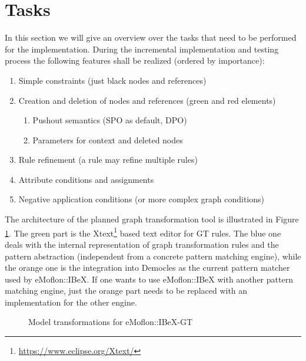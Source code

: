 \section{Tasks}
\label{tasks}
In this section we will give an overview over the tasks that need to be performed for the implementation.
During the incremental implementation and testing process the following features shall be realized (ordered by importance):
\begin{enumerate}
	\item Simple constraints (just black nodes and references)
	\item Creation and deletion of nodes and references (green and red elements)
		\begin{enumerate}
			\item Pushout semantics (SPO as default, DPO)
			\item Parameters for context and deleted nodes
		\end{enumerate}
	\item Rule refinement (a rule may refine multiple rules)
	\item Attribute conditions and assignments
	\item Negative application conditions (or more complex graph conditions)
\end{enumerate}
The architecture of the planned graph transformation tool is illustrated in Figure \ref{fig:model-transformations}. 
The green part is the Xtext\footnote{\url{https://www.eclipse.org/Xtext/}} based text editor for GT rules.
The blue one deals with the internal representation of graph transformation rules and the pattern abstraction (independent from a concrete pattern matching engine),
while the orange one is the integration into Democles as the current pattern matcher used by eMoflon::IBeX.
If one wants to use eMoflon::IBeX with another pattern matching engine, just the orange part needs to be replaced with an implementation for the other engine.  

\begin{figure}[h!]
	\centering
	
	\caption{Model transformations for eMoflon::IBeX-GT}
	\label{fig:model-transformations}
\end{figure}

